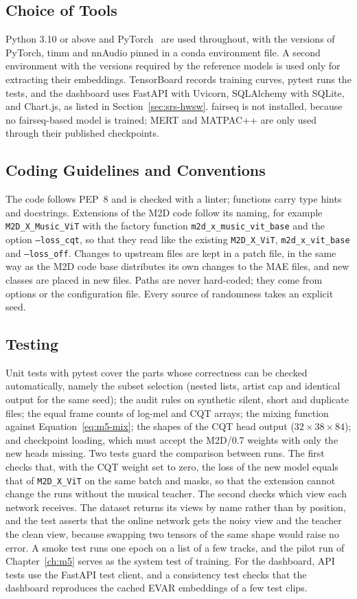 \documentclass{FastFyp}
\begin{document}
\subsection{Choice of Tools}
Python 3.10 or above and PyTorch~\cite{ref:Paszke:2019pytorch} are used throughout, with the versions of PyTorch, timm and nnAudio pinned in a conda environment file. A second environment with the versions required by the reference models is used only for extracting their embeddings. TensorBoard records training curves, pytest runs the tests, and the dashboard uses FastAPI with Uvicorn, SQLAlchemy with SQLite, and Chart.js, as listed in Section~\ref{sec:srs-hwsw}. fairseq is not installed, because no fairseq-based model is trained; MERT and MATPAC++ are only used through their published checkpoints.

\subsection{Coding Guidelines and Conventions}
The code follows PEP~8 and is checked with a linter; functions carry type hints and docstrings. Extensions of the M2D code follow its naming, for example \texttt{M2D\_X\_Music\_ViT} with the factory function \texttt{m2d\_x\_music\_vit\_base} and the option \texttt{--loss\_cqt}, so that they read like the existing \texttt{M2D\_X\_ViT}, \texttt{m2d\_x\_vit\_base} and \texttt{--loss\_off}. Changes to upstream files are kept in a patch file, in the same way as the M2D code base distributes its own changes to the MAE files, and new classes are placed in new files. Paths are never hard-coded; they come from options or the configuration file. Every source of randomness takes an explicit seed.

\subsection{Testing}
Unit tests with pytest cover the parts whose correctness can be checked automatically, namely the subset selection (nested lists, artist cap and identical output for the same seed); the audit rules on synthetic silent, short and duplicate files; the equal frame counts of log-mel and CQT arrays; the mixing function against Equation~\ref{eq:m5-mix}; the shapes of the CQT head output ($32\times38\times84$); and checkpoint loading, which must accept the M2D/0.7 weights with only the new heads missing. Two tests guard the comparison between runs. The first checks that, with the CQT weight set to zero, the loss of the new model equals that of \texttt{M2D\_X\_ViT} on the same batch and masks, so that the extension cannot change the runs without the musical teacher. The second checks which view each network receives. The dataset returns its views by name rather than by position, and the test asserts that the online network gets the noisy view and the teacher the clean view, because swapping two tensors of the same shape would raise no error. A smoke test runs one epoch on a list of a few tracks, and the pilot run of Chapter~\ref{ch:m5} serves as the system test of training. For the dashboard, API tests use the FastAPI test client, and a consistency test checks that the dashboard reproduces the cached EVAR embeddings of a few test clips.
\end{document}

